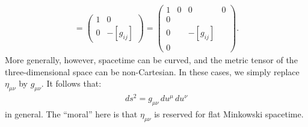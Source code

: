 \documentclass{article}
\theoremstyle{definition}
\begin{document}
\begin{align*}
[\eta_{\mu\nu}] = 
\begin{pmatrix}
1 & 0\\
0 & -[g_{ij}]
\end{pmatrix}
=
\begin{pmatrix}
1 & 0 & 0 & 0\\
0 & & &\\
0 & & -[g_{ij}] &\\
0 & & &
\end{pmatrix}.
\end{align*} 
More generally, however, spacetime can be curved, and the metric tensor of the three-dimensional space can be non-Cartesian. In these cases, we simply replace $\eta_{\mu\nu}$ by $g_{\mu\nu}$. It follows that:
\begin{align*}
\boxed{ds^2 = g_{\mu\nu}\,du^\mu\,du^\nu}
\end{align*}
in general. The ``moral'' here is that $\eta_{\mu\nu}$ is reserved for flat Minkowski spacetime. \\
\end{document}
